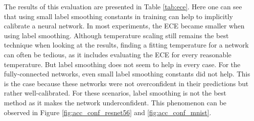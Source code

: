 The results of this evaluation are presented in Table \ref{tab:ece}. Here one can see that using small label smoothing constants in training can help to implicitly calibrate a neural network. In most experiments, the ECE became smaller when using label smoothing. Although temperature scaling still remains the best technique when looking at the results, finding a fitting temperature for a network can often be tedious, as it includes evaluating the ECE for every reasonable temperature. But label smoothing does not seem to help in every case. For the fully-connected networks, even small label smoothing constants did not help. This is the case because these networks were not overconfident in their predictions but rather well-calibrated. For these scenarios, label smoothing is not the best method as it makes the network underconfident. This phenomenon can be observed in Figure \ref{fig:acc_conf_resnet56} and \ref{fig:acc_conf_mnist}. 

